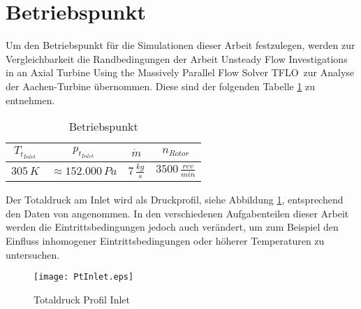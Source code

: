 \section{Betriebspunkt}
\label{subsec:aachensetup}
Um den Betriebspunkt für die Simulationen dieser Arbeit festzulegen, werden zur Vergleichbarkeit die Randbedingungen der Arbeit \glqq Unsteady Flow Investigations in an
Axial Turbine Using the Massively
Parallel Flow Solver TFLO\grqq \, \cite{ufi2001YaoDavis} zur Analyse der Aachen-Turbine übernommen. Diese sind der folgenden Tabelle \ref{tab:aachensetup} zu entnehmen.
\begin{table}[H]
\centering
\caption{Betriebspunkt} \label{tab:aachensetup}
\begin{tabular}{ c| c| c| c}
$T_{t_{Inlet}}$&$p_{t_{Inlet}}$&$\dot m$&$n_{Rotor}$\\
\hline
$305 \, K$&$\approx152.000 \, Pa$&$7 \, \frac{kg}{s}$&$3500 \, \frac{rev}{min}$\\
\end{tabular}
\end{table}
Der Totaldruck am Inlet wird als Druckprofil, siehe Abbildung \ref{fig:ptinlet}, entsprechend den Daten von \cite[p. 4]{ufi2001YaoDavis} angenommen.
In den verschiedenen Aufgabenteilen dieser Arbeit werden die Eintrittsbedingungen jedoch auch verändert, um zum Beispiel den Einfluss inhomogener Eintrittsbedingungen oder höherer Temperaturen zu untersuchen.

\begin{figure}[htbp]
	\centering
	\texttt{[image: PtInlet.eps]}
	\caption{Totaldruck Profil Inlet} \label{fig:ptinlet}
\end{figure}







